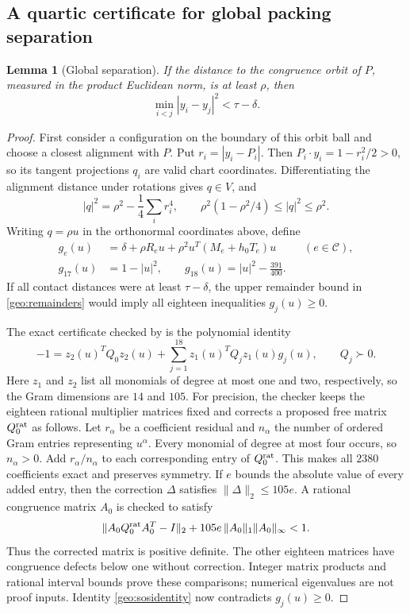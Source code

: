 \documentclass[12pt,reqno]{amsart}
\newtheorem{lemma}[theorem]{Lemma}
\theoremstyle{definition}
\numberwithin{equation}{section}
\begin{document}
\subsection{A quartic certificate for global packing separation}
\begin{lemma}[Global separation]\label{geo:gap}
If the distance to the congruence orbit of $P$, measured in the
product Euclidean norm, is at least $\rho$, then
\[
 \min_{i<j}|y_i-y_j|^2<\tau-\delta.
\]
\end{lemma}
\begin{proof}
First consider a configuration on the boundary of this orbit ball
and choose a closest alignment with $P$. Put $r_i=|y_i-P_i|$.
Then $P_i\cdot y_i=1-r_i^2/2>0$, so its tangent projections $q_i$
are valid chart coordinates. Differentiating the alignment distance
under rotations gives $q\in V$, and
\[
 |q|^2=\rho^2-\frac14\sum_i r_i^4,
 \qquad \rho^2(1-\rho^2/4)\le|q|^2\le\rho^2.
\]
Writing $q=\rho u$ in the orthonormal coordinates above, define
\[
 \begin{aligned}
 g_e(u)&=\delta+\rho R_eu+\rho^2u^T(M_e+h_0T_e)u
                       &&(e\in\mathcal C),\\
 g_{17}(u)&=1-|u|^2,\qquad
 g_{18}(u)=|u|^2-\frac{391}{400}.
 \end{aligned}
\]
If all contact distances were at least $\tau-\delta$, the upper
remainder bound in \eqref{geo:remainders} would imply all eighteen
inequalities $g_j(u)\ge0$.

The exact certificate checked by
 is the polynomial identity
\begin{equation}\label{geo:sosidentity}
 -1=z_2(u)^TQ_0z_2(u)
       +\sum_{j=1}^{18}z_1(u)^TQ_jz_1(u)g_j(u),
 \qquad Q_j\succ0.
\end{equation}
Here $z_1$ and $z_2$ list all monomials of degree at most one and two,
respectively, so the Gram dimensions are $14$ and $105$.
For precision, the checker keeps the eighteen rational multiplier
matrices fixed and corrects a proposed free matrix $Q_0^{\rm rat}$ as follows.
Let $r_\alpha$ be a coefficient residual and $n_\alpha$ the number
of ordered Gram entries representing $u^\alpha$. Every monomial of
degree at most four occurs, so $n_\alpha>0$. Add
$r_\alpha/n_\alpha$ to each corresponding entry of $Q_0^{\rm rat}$.
This makes all $2380$ coefficients exact and preserves symmetry.
If $e$ bounds the absolute value of every added entry, then the
correction $\Delta$ satisfies $\|\Delta\|_2\le105e$.
A rational congruence matrix $A_0$ is checked to satisfy
\[
 \|A_0Q_0^{\rm rat}A_0^T-I\|_2+
        105e\,\|A_0\|_1\|A_0\|_\infty<1.
\]
Thus the corrected matrix is positive definite. The other eighteen
matrices have congruence defects below one without correction.
Integer matrix products and rational interval bounds prove these
comparisons; numerical eigenvalues are not proof inputs.
Identity \eqref{geo:sosidentity} now contradicts $g_j(u)\ge0$.


\end{proof}
\end{document}
